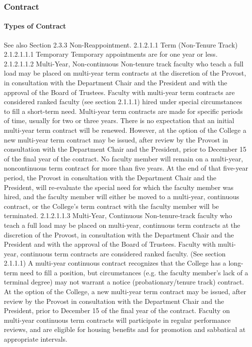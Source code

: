 \documentclass[letterpaper, 11pt]{article}
\begin{document}
		\subsubsection{Contract}
			\paragraph{Types of Contract}
				See also Section 2.3.3 Non-Reappointment.
				2.1.2.1.1 Term (Non-Tenure Track)
				2.1.2.1.1.1 Temporary
				Temporary appointments are for one year or less.
				2.1.2.1.1.2 Multi-Year, Non-continuous
				Non-tenure track faculty who teach a full load may be placed on multi-year term contracts at the discretion of the Provost, in consultation with the Department Chair and the President and with the approval of the Board of Trustees.  Faculty with multi-year term contracts are considered ranked faculty (see section 2.1.1.1) hired under special circumstances to fill a short-term need.  Multi-year term contracts are made for specific periods of time, usually for two or three years.  There is no expectation that an initial multi-year term contract will be renewed.  However, at the option of the College a new multi-year term contract may be issued, after review by the Provost in consultation with the Department Chair and the President, prior to December 15 of the final year of the contract.  No faculty member will remain on a multi-year, noncontinuous term contract for more than five years.  At the end of that five-year period, the Provost in consultation with the Department Chair and the President, will re-evaluate the special need for which the faculty member was hired, and the faculty member will either be moved to a multi-year, continuous contract, or the College's term contract with the faculty member will be terminated.
				2.1.2.1.1.3 Multi-Year, Continuous
				Non-tenure-track faculty who teach a full load may be placed on multi-year, continuous term contracts at the discretion of the Provost, in consultation with the Department Chair and the President and with the approval of the Board of Trustees. Faculty with multi-year, continuous term contracts are considered ranked faculty.  (See section 2.1.1.1)  A multi-year continuous contract recognizes that the College has a long-term need to fill a position, but circumstances (e.g. the faculty member's lack of a terminal degree) may not warrant a notice (probationary/tenure track) contract.  At the option of the College, a new multi-year term contract may be issued, after review by the Provost in consultation with the Department Chair and the President, prior to December 15 of the final year of the contract. Faculty on multi-year continuous term contracts will participate in regular performance reviews, and are eligible for housing benefits and for promotion and sabbatical at appropriate intervals.
\end{document}
